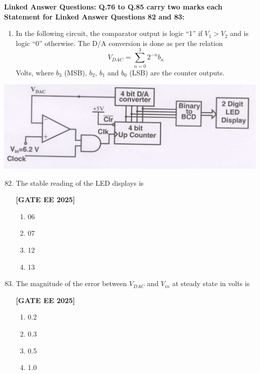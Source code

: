 \documentclass[12pt]{article}
\begin{document}
\vspace{1em}
 \large \textbf {Linked Answer Questions: Q.76 to Q.85 carry two marks each}
 \large \textbf {Statement for Linked Answer Questions 82 and 83: }
\vspace{1em}
\begin{enumerate}
\item In the following circuit, the comparator output is logic “1” if $V_1 > V_2$ and is logic “0” otherwise. The D/A conversion is done as per the relation
\[
V_{DAC} = \sum_{n=0}^3 2^{-n} b_n
\]
Volts, where $b_3$ (MSB), $b_2$, $b_1$ and $b_0$ (LSB) are the counter outputs.
\end{enumerate}
\begin{center}
\includegraphics[width=0.6\columnwidth]{figs/q8283.png}
\end{center}

\begin{enumerate}[leftmargin=*, label=\textbf{Q.\arabic*:}]
\setcounter{enumi}{81}

\item The stable reading of the LED displays is
 
\noindent \textbf{[GATE EE 2025]}
\begin{enumerate}
  \item 06
  \item 07
  \item 12
  \item 13
\end{enumerate}

\item The magnitude of the error between $V_{DAC}$ and $V_{in}$ at steady state in volts is
 
\noindent \textbf{[GATE EE 2025]}
\begin{enumerate}
  \item 0.2
  \item 0.3
  \item 0.5
  \item 1.0
\end{enumerate}

\end{enumerate}
\end{document}

